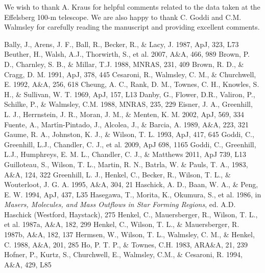 \documentclass[oldversion]{aa}
\begin{document}
\acknowledgements
We wish to thank A. Kraus for helpful comments related to the 
data taken at the Effelsberg 100-m telescope. We are also 
happy to thank C. Goddi and C.M. Walmsley for carefully 
reading the manuscript and providing excellent comments. 


\begin{thebibliography}{}
  Bally, J., Arens, J. F., Ball, R., Becker, R., \& Lacy, J. 1987,
  ApJ, 323, L73
  Beuther, H., Walsh, A.J., Thorwirth, S., et al. 2007, A\&A, 466, 989
  Brown, P. D., Charnley, S. B., \& Millar, T.J. 1988, MNRAS, 231, 409 
  Brown, R. D., \& Cragg, D. M. 1991, ApJ, 378, 445
  Cesaroni, R., Walmsley, C. M., \& Churchwell, E. 1992, A\&A, 256, 618
  Cheung, A. C., Rank, D. M., Townes, C. H., Knowles, S. H., \& Sullivan, W. T.
  1969, ApJ, 157, L13
  Danby, G., Flower, D.R., Valiron, P., Schilke, P., \& Walmsley, C.M. 1988, 
  MNRAS, 235, 229 
  Eisner, J. A., Greenhill, L. J., Herrnstein, J. R., Moran, J. M., \& Menten, K. M. 
  2002, ApJ, 569, 334
  Fuente, A., Mart\'{\i}n-Pintado, J., Alcolea, J., \& Barcia, A. 1989, A\&A, 223, 321
  Gaume, R. A., Johnston, K. J., \& Wilson, T. L. 1993, ApJ, 417, 645
  Goddi, C., Greenhill, L.J., Chandler, C. J., et al. 2009, ApJ 698, 1165
  Goddi, C., Greenhill, L.J., Humphreys, E. M. L., Chandler, C. J., \& Matthews 
  2011, ApJ 739, L13
  Guilloteau, S., Wilson, T. L., Martin, R. N., Batrla, W. \& Pauls, T. A., 1983,
  A\&A, 124, 322
  Greenhill, L. J., Henkel, C., Becker, R., Wilson, T. L., \& Wouterloot, J. G. A. 1995,
  A\&A, 304, 21
  Haschick, A. D., Baan, W. A., \& Peng, E. W. 1994, ApJ, 437, L35
  Hasegawa, T., Morita, K., Okumura, S., et al. 1986, in {\it Masers, Molecules, and 
  Mass Outflows in Star Forming Regions}, ed. A.D. Haschick (Westford, Haystack), 275
  Henkel, C., Mauersberger, R., Wilson, T. L., et al. 1987a, A\&A, 182, 299
  Henkel, C., Wilson, T. L., \& Mauersberger, R. 1987b, A\&A, 182, 137
  Hermsen, W., Wilson, T. L., Walmsley, C. M., \& Henkel, C. 1988, A\&A, 201, 285
  Ho, P. T. P., \& Townes, C.H. 1983, ARA\&A, 21, 239
  Hofner, P., Kurtz, S., Churchwell, E., Walmsley, C.M., \& Cesaroni, R. 1994, A\&A, 429, L85

\end{thebibliography}
\end{document}
